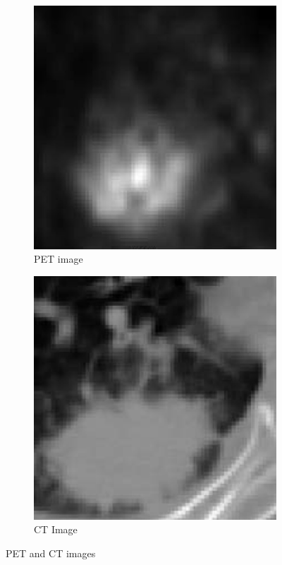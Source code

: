 \begin{figure}[h]
	\centering
	\begin{subfigure}{.5\textwidth}
		\centering
		\includegraphics[width=.8\linewidth]{fig/pet2}
		\caption{PET image}
		\label{fig:sub1}
	\end{subfigure}%
	\begin{subfigure}{.5\textwidth}
		\centering
		\includegraphics[width=.8\linewidth]{fig/ct2}
		\caption{CT Image}
		\label{fig:sub2}
	\end{subfigure}
	\caption{PET and CT images}
	\label{fig:petct2}
\end{figure}


